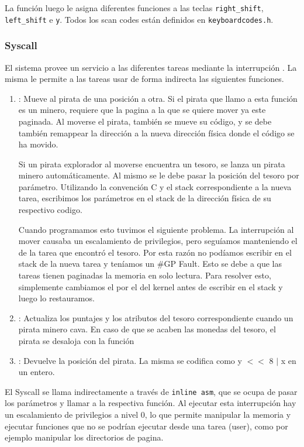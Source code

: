 La función  luego le asigna diferentes funciones a las teclas \texttt{right\_shift}, \texttt{left\_shift} e \texttt{y}. Todos los scan codes están definidos en \texttt{keyboardcodes.h}.

\subsubsection{Syscall}
El sistema provee un servicio a las diferentes tareas mediante la interrupción . La misma le permite a las tareas usar de forma indirecta las siguientes funciones.
\begin{enumerate}
\item {}: Mueve al pirata de una posición a otra. Si el pirata que llamo a esta función es un minero, requiere que la pagina a la que  se quiere mover ya este paginada. Al moverse el pirata, también se mueve su código, y se debe también remappear la dirección  a la nueva dirección física donde el código se ha movido.

Si un pirata explorador al moverse encuentra un tesoro, se lanza un pirata minero automáticamente. Al mismo se le debe pasar la posición del tesoro por parámetro. Utilizando la convención C y el stack correspondiente a la nueva tarea, escribimos los parámetros en el stack de la dirección física de su respectivo codigo.

Cuando programamos esto tuvimos el siguiente problema. La interrupción al mover causaba un escalamiento de privilegios, pero seguíamos manteniendo el  de la tarea que encontró el tesoro. Por esta razón no podíamos escribir en el stack de la nueva tarea y teníamos un \#GP Fault. Esto se debe a que las tareas tienen paginadas la memoria en solo lectura. Para resolver esto, simplemente cambiamos el  por el del kernel antes de escribir en el stack y luego lo restauramos.

\item {}: Actualiza los puntajes y los atributos del tesoro correspondiente cuando un pirata minero cava. En caso de que se acaben las monedas del tesoro, el pirata se desaloja con la función 
\item {}: Devuelve la posición del pirata. La misma se codifica como y $<<$ 8 $|$ x en un entero.
\end{enumerate}

El Syscall se llama indirectamente a través de \texttt{inline asm}, que se ocupa de pasar los parámetros y llamar a la respectiva función. Al ejecutar esta interrupción hay un escalamiento de privilegios a nivel 0, lo que permite manipular la memoria y ejecutar funciones que no se podrían ejecutar desde una tarea (user), como por ejemplo manipular los directorios de pagina.

